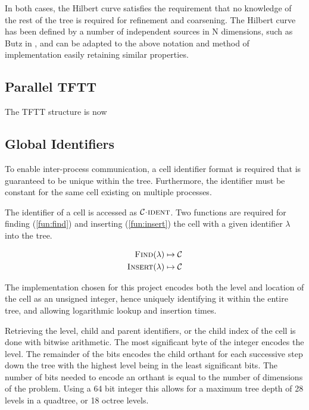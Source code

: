 \documentclass{IIBproject}
\newcommand{\acc}{{\mkern 0.5mu\cdot\mkern 0.5mu}}
\numberwithin{figure}{section}
\begin{document}
        In both cases, the Hilbert curve satisfies the requirement that no knowledge of the rest of the tree is required for refinement and coarsening. The Hilbert curve has been defined by a number of independent sources in N dimensions, such as Butz in \cite{butz71}, and can be adapted to the above notation and method of implementation easily retaining similar properties. 



    \subsection{Parallel TFTT} %
        \label{sec:parallel}

        The TFTT structure is now 



    \subsection{Global Identifiers} %
        \label{sec:globalid}

        To enable inter-process communication, a cell identifier format is required that is guaranteed to be unique within the tree. Furthermore, the identifier must be constant for the same cell existing on multiple processes.

        The identifier of a cell is accessed as $\mathcal{C}\acc\textproc{ident}$. Two functions are required for finding (\ref{fun:find}) and inserting (\ref{fun:insert}) the cell with a given identifier $\lambda$ into the tree.

        \begin{align}
            \label{fun:find}
            \textproc{Find}(\lambda) \mapsto \mathcal{C} \\
            \label{fun:insert}
            \textproc{Insert}(\lambda) \mapsto \mathcal{C}
        \end{align}

        The implementation chosen for this project encodes both the level and location of the cell as an unsigned integer, hence uniquely identifying it within the entire tree, and allowing logarithmic lookup and insertion times.

        Retrieving the level, child and parent identifiers, or the child index of the cell is done with bitwise arithmetic. The most significant byte of the integer encodes the level. The remainder of the bits encodes the child orthant for each successive step down the tree with the highest level being in the least significant bits. The number of bits needed to encode an orthant is equal to the number of dimensions of the problem. Using a 64 bit integer this allows for a maximum tree depth of 28 levels in a quadtree, or 18 octree levels.
\end{document}
